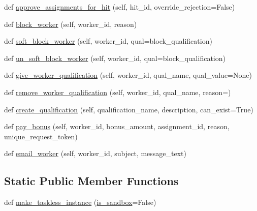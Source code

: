 \begin{DoxyCompactItemize}
\item 
def \hyperlink{classparlai_1_1mturk_1_1core_1_1legacy__2018_1_1mturk__manager_1_1MTurkManager_a62307da39b71ecdc0b7d5ff09da4cd7a}{approve\+\_\+assignments\+\_\+for\+\_\+hit} (self, hit\+\_\+id, override\+\_\+rejection=False)
\item 
def \hyperlink{classparlai_1_1mturk_1_1core_1_1legacy__2018_1_1mturk__manager_1_1MTurkManager_a9f0d7c8eead5fc1a64b097880aba47a0}{block\+\_\+worker} (self, worker\+\_\+id, reason)
\item 
def \hyperlink{classparlai_1_1mturk_1_1core_1_1legacy__2018_1_1mturk__manager_1_1MTurkManager_ad5e39f8bc2cf7d3a0ffbddfa3465f523}{soft\+\_\+block\+\_\+worker} (self, worker\+\_\+id, qual=\textquotesingle{}block\+\_\+qualification\textquotesingle{})
\item 
def \hyperlink{classparlai_1_1mturk_1_1core_1_1legacy__2018_1_1mturk__manager_1_1MTurkManager_ab4af6a172516c9f22be1e71640846423}{un\+\_\+soft\+\_\+block\+\_\+worker} (self, worker\+\_\+id, qual=\textquotesingle{}block\+\_\+qualification\textquotesingle{})
\item 
def \hyperlink{classparlai_1_1mturk_1_1core_1_1legacy__2018_1_1mturk__manager_1_1MTurkManager_a2c9bda32f8ee3b93351dd17cb5392131}{give\+\_\+worker\+\_\+qualification} (self, worker\+\_\+id, qual\+\_\+name, qual\+\_\+value=None)
\item 
def \hyperlink{classparlai_1_1mturk_1_1core_1_1legacy__2018_1_1mturk__manager_1_1MTurkManager_abd558e7e15be458ebb7d0f6827b7da9e}{remove\+\_\+worker\+\_\+qualification} (self, worker\+\_\+id, qual\+\_\+name, reason=\textquotesingle{}\textquotesingle{})
\item 
def \hyperlink{classparlai_1_1mturk_1_1core_1_1legacy__2018_1_1mturk__manager_1_1MTurkManager_a0cb662e0432cc407abdee961f0d7d8e0}{create\+\_\+qualification} (self, qualification\+\_\+name, description, can\+\_\+exist=True)
\item 
def \hyperlink{classparlai_1_1mturk_1_1core_1_1legacy__2018_1_1mturk__manager_1_1MTurkManager_afeb26b61e7d22c89df8c61e246e78532}{pay\+\_\+bonus} (self, worker\+\_\+id, bonus\+\_\+amount, assignment\+\_\+id, reason, unique\+\_\+request\+\_\+token)
\item 
def \hyperlink{classparlai_1_1mturk_1_1core_1_1legacy__2018_1_1mturk__manager_1_1MTurkManager_af1f80f4a287a64eb89196fdcd1363f97}{email\+\_\+worker} (self, worker\+\_\+id, subject, message\+\_\+text)
\end{DoxyCompactItemize}
\subsection*{Static Public Member Functions}
\begin{DoxyCompactItemize}
\item 
def \hyperlink{classparlai_1_1mturk_1_1core_1_1legacy__2018_1_1mturk__manager_1_1MTurkManager_af25a455c062bfcd5747200f72786624c}{make\+\_\+taskless\+\_\+instance} (\hyperlink{classparlai_1_1mturk_1_1core_1_1legacy__2018_1_1mturk__manager_1_1MTurkManager_a7740635b004b2183041869a0ba85ea8c}{is\+\_\+sandbox}=False)
\end{DoxyCompactItemize}
